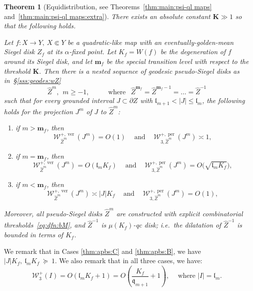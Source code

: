 \documentclass{amsart}
\renewcommand{\sp}{{\ \ }}
\newcommand{\1}{{\mathbb 1 }}
\newcommand{\Width}{{\mathcal W}}
\newcommand{\wZ}{{\widehat Z}}
\newcommand{\bK}{{\mathbf K}}
\newcommand{\bbm}{{\mathbf m}}
\newcommand{\qq}{\mathfrak{q}}
\newcommand{\length}{{\mathfrak l}}
\newcommand\ver{{\operatorname{ver}}}
\newcommand\per{{\operatorname{per}}}
\newtheorem{thm}{Theorem}[section]
\theoremstyle{remark}
\numberwithin{equation}{section}
\theoremstyle{definition}
\begin{document}
\begin{thm}[Equidistribution, see Theorems~\ref{thm:main:psi-ql maps} and~\ref{thm:main:psi-ql maps:extra}]\label{thm:main:ql maps} There exists an absolute constant $\bK\gg 1$ so that the following holds.

Let $f: X \longrightarrow Y,\ X\Subset Y$ be a quadratic-like map with an eventually-golden-mean Siegel disk $Z_f$ at its $\alpha$-fixed point.
Let $K_f = W(f)$ be the degeneration of $f$ around its Siegel disk, and let $\bbm_f$ be the special transition level with respect to the threshold $\bK$.
Then there is a nested sequence of geodesic pseudo-Siegel disks as in~\S\ref{sss:geodes:wZ} \[\wZ^m,\sp  m\ge -1,\hspace{1cm}\text{ where }\sp \wZ^{\bbm_f}= \wZ^{\bbm_f-1}=\dots =\wZ^{-1}\] such that for every grounded interval $J\subset \partial Z$ with $\length_{m+1}< |J|\le \length_{m}$, the following holds for the projection $J^m$ of $J$ to $\wZ^m$:
\begin{enumerate}[ label=(\Alph*)]
    \item \label{thm:apbs:A} if $m> \bbm_f$, then \[\Width_{\wZ^m}^{+,\ver} (J^m)=O(1) \sp\sp\text{ and }\sp\sp \Width_{3,\wZ^m}^{+,\per} (J^m)\asymp 1,\]
    \item\label{thm:apbs:B} if $m= \bbm_f$, then 
    \[\Width_{\wZ^m}^{+,\ver} (J^m)= O(\length_m K_f)  \sp\sp\text{ and }\sp\sp \Width_{3,\wZ^m}^{+,\per} (J^m)=O\big(\sqrt{\length_m K_f }\big),\]
  \item \label{thm:apbs:C} if $m< \bbm_f$, then 
    \[\Width_{\wZ^m}^{+,\ver} (J^m)\asymp |J|K_f  \sp\sp\text{ and }\sp\sp \Width_{3,\wZ^m}^{+,\per} (J^m)=O(1),\]
\end{enumerate}

Moreover, all pseudo-Siegel disks $\wZ^m$ are constructed with explicit combinatorial thresholds~\eqref{eq:dfn:bM}, and $\wZ^{-1}$ is $\mu(K_f)$-qc disk; i.e.~the dilatation of $\wZ^{-1}$ is bounded in terms of $K_f$.
\end{thm}







We remark that in Cases \ref{thm:apbs:C} and \ref{thm:apbs:B}, we have
$ |J|K_f, \ \length_m K_f \  \succeq\  1  $. We also remark that in all three cases, we have: \[\Width^+_3(I) =O(\length_m K_f+1)=O\left(\frac{K_f}{\qq_{m+1}}+1\right), \sp\sp\text{ where }|I|=\length_m.\]
\end{document}
